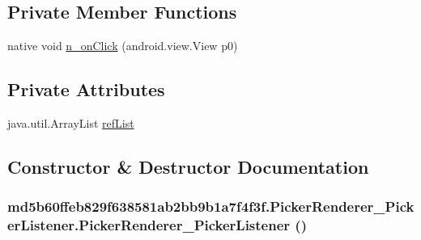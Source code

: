 \subsection*{Private Member Functions}
\begin{CompactItemize}
\item 
native void \hyperlink{classmd5b60ffeb829f638581ab2bb9b1a7f4f3f_1_1_picker_renderer___picker_listener_3c25433046ef21b522e4ecdfcec61d76}{n\_\-onClick} (android.view.View p0)
\end{CompactItemize}
\subsection*{Private Attributes}
\begin{CompactItemize}
\item 
java.util.ArrayList \hyperlink{classmd5b60ffeb829f638581ab2bb9b1a7f4f3f_1_1_picker_renderer___picker_listener_5a5c7704983e4c275b2f8194214c4e9c}{refList}
\end{CompactItemize}


\subsection{Constructor \& Destructor Documentation}
\hypertarget{classmd5b60ffeb829f638581ab2bb9b1a7f4f3f_1_1_picker_renderer___picker_listener_47833692a812ec436b2f7e80c0ece540}{
\subsubsection[{PickerRenderer\_\-PickerListener}]{\setlength{\rightskip}{0pt plus 5cm}md5b60ffeb829f638581ab2bb9b1a7f4f3f.PickerRenderer\_\-PickerListener.PickerRenderer\_\-PickerListener ()}}
\label{classmd5b60ffeb829f638581ab2bb9b1a7f4f3f_1_1_picker_renderer___picker_listener_47833692a812ec436b2f7e80c0ece540}




